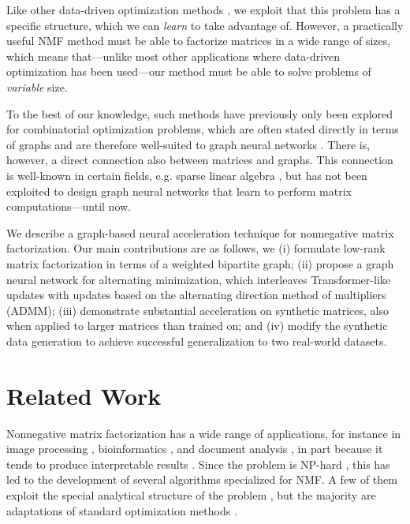 \documentclass{article}
\begin{document}
Like other data-driven optimization methods \citep{Li2016,Chen2021}, we exploit that this problem has a specific structure, which we can \emph{learn} to take advantage of. However, a practically useful NMF method must be able to factorize matrices in a wide range of sizes, which means that---unlike most other applications where data-driven optimization has been used---our method must be able to solve problems of \emph{variable} size. 

To the best of our knowledge, such methods have previously only been explored for combinatorial optimization problems, which are often stated directly in terms of graphs and are therefore well-suited to graph neural networks \citep{Gasse2019,Cappart2021}. There is, however, a direct connection also between matrices and graphs. This connection is well-known in certain fields, e.g. sparse linear algebra \citep{Kepner2011, Duff2017}, but has not been exploited to design graph neural networks that learn to perform matrix computations---until now.

We describe a graph-based neural acceleration technique for nonnegative matrix factorization. Our main contributions are as follows, we (i) formulate low-rank matrix factorization in terms of a weighted bipartite graph; (ii) propose a graph neural network for alternating minimization, which interleaves Transformer-like updates with updates based on the alternating direction method of multipliers (ADMM); (iii) demonstrate substantial acceleration on synthetic matrices, also when applied to larger matrices than trained on; and (iv) modify the synthetic data generation to achieve successful generalization to two real-world datasets.

\section{Related Work}
Nonnegative matrix factorization has a wide range of applications, for instance in image processing \citep{Fu2019}, bioinformatics \citep{Kim2007}, and document analysis \citep{Shahnaz2006}, in part because it tends to produce interpretable results \citep{Lee1999}. Since the problem is NP-hard \citep{Vavasis2010}, %
this has led to the development of several algorithms specialized for NMF. A few of them exploit the special analytical structure of the problem \citep{Recht2012, Gillis2013}, but the majority are adaptations of standard optimization methods \citep{Lin2007,Kim2008,Xu2013,Gillis2020}.
\end{document}
